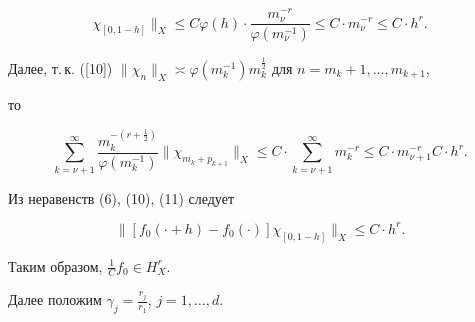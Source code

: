 \begin{pf}
\begin{equation}
\chi_{[0,1-h]} \|_{X}\leq C\varphi(h)\cdot  


\frac{m_{\nu}^{-r}}{\varphi(m_{\nu}^{-1})}\leq C\cdot m_{\nu}^{-r}\leq 


C\cdot h^{r}.


\end{equation}


Далее, т.\,к. ([10]) $\|\chi_{n}\|_{X}\asymp 


\varphi(m_{k}^{-1})m_{k}^{\frac{1}{2}}$ для  $n=m_{k}+1,\dotsc,m_{k+1}$,


то 


\begin{equation}


\sum_{k=\nu+1}^{\infty} \frac{m_{k}^{-(r+\frac{1}{2})}}{ 


\varphi(m_{k}^{-1})}\|\chi_{m_{k}+p_{k+1}}\|_{X}  


\leq C\cdot \sum_{k=\nu+1}^{\infty} m_{k}^{-r}\leq C\cdot m_{\nu+1}^{-r}


C\cdot h^{r}. 


\end{equation}


Из неравенств (6), (10), (11) следует 


$$


\|[f_{0}(\cdot+h)-f_{0}(\cdot)]\chi_{[0, 1-h]}\|_{X}\leq C\cdot h^{r}.


$$


Таким образом, $\frac{1}{C}f_{0}\in H_{X}^{r}$.


\end{pf}





Далее положим $\gamma_{j}=\frac{r_{j}}{r_{1}}$, $j=1,\dotsc,d$.








